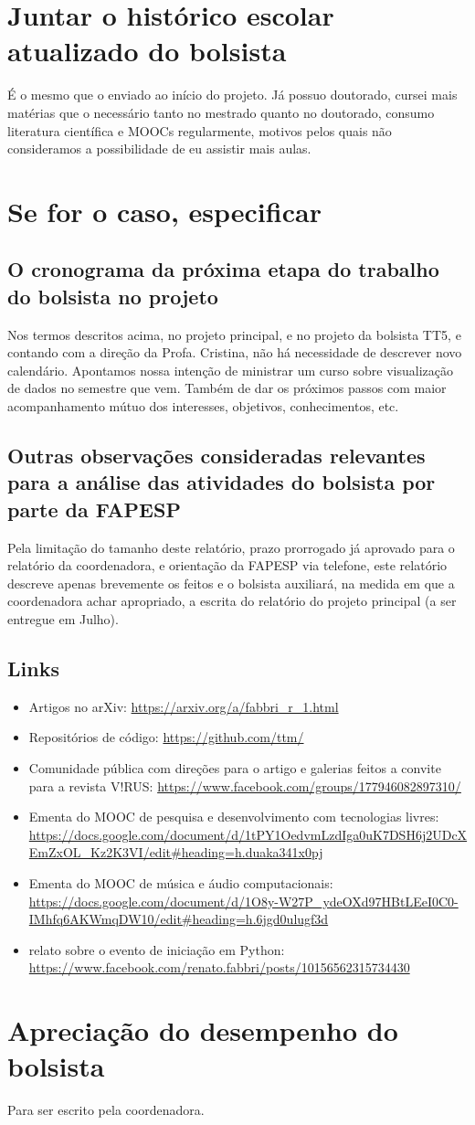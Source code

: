 \documentclass[a4paper, 11pt]{article}
\begin{document}
\section{Juntar o histórico escolar atualizado do bolsista}
É o mesmo que o enviado ao início do projeto.
Já possuo doutorado, cursei mais matérias que o necessário tanto no mestrado quanto no doutorado,
consumo literatura científica e MOOCs regularmente, motivos pelos quais não consideramos a possibilidade
de eu assistir mais aulas.

\section{Se for o caso, especificar}
\subsection{O cronograma da próxima etapa do trabalho do bolsista no projeto}
Nos termos descritos acima, no projeto principal, e no projeto da bolsista TT5,
e contando com a direção da Profa. Cristina, não há necessidade de descrever novo calendário.
Apontamos nossa intenção de ministrar um curso sobre visualização de dados no semestre que vem.
Também de dar os próximos passos com maior acompanhamento mútuo dos interesses,
objetivos, conhecimentos, etc.

\subsection{Outras observações consideradas relevantes para a análise das atividades do bolsista por parte da FAPESP}
Pela limitação do tamanho deste relatório, prazo prorrogado já aprovado para o relatório da coordenadora,
e orientação da FAPESP via telefone, este relatório descreve apenas brevemente os feitos e o bolsista
auxiliará, na medida em que a coordenadora achar apropriado, a escrita do relatório do projeto principal
(a ser entregue em Julho).

\subsection{Links}
\begin{itemize}
  \item Artigos no arXiv: \url{https://arxiv.org/a/fabbri_r_1.html}
  \item Repositórios de código: \url{https://github.com/ttm/}
  \item Comunidade pública com direções para o artigo e galerias feitos a convite para a revista V!RUS: \url{https://www.facebook.com/groups/177946082897310/}
  \item Ementa do MOOC de pesquisa e desenvolvimento com tecnologias livres: \url{https://docs.google.com/document/d/1tPY1OedvmLzdIga0uK7DSH6j2UDcXEmZxOL_Kz2K3VI/edit#heading=h.duaka341x0pj}
  \item Ementa do MOOC de música e áudio computacionais: \url{https://docs.google.com/document/d/1O8y-W27P_ydeOXd97HBtLEeI0C0-IMhfq6AKWmqDW10/edit#heading=h.6jgd0ulugf3d}
  \item relato sobre o evento de iniciação em Python: \url{https://www.facebook.com/renato.fabbri/posts/10156562315734430}
\end{itemize}

\section{Apreciação do desempenho do bolsista}

Para ser escrito pela coordenadora.
\end{document}
